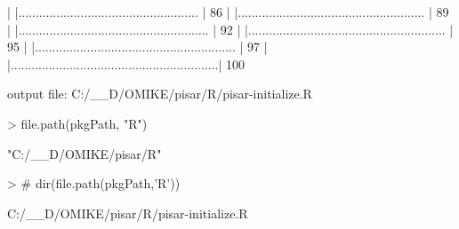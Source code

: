 \documentclass[a4paper,12pt]{article}\usepackage[]{graphicx}\usepackage[]{color}
\begin{document}
\begin{Schunk}
\begin{Soutput}
  |                                                                  
  |....................................................        |  86%
  |                                                                  
  |......................................................      |  89%
  |                                                                  
  |.......................................................     |  92%
  |                                                                  
  |.........................................................   |  95%
  |                                                                  
  |..........................................................  |  97%
  |                                                                  
  |............................................................| 100%
\end{Soutput}
\begin{Soutput}
output file: C:/__D/OMIKE/pisar/R/pisar-initialize.R
\end{Soutput}
\begin{Sinput}
> file.path(pkgPath, "R")
\end{Sinput}
\begin{Soutput}
[1] "C:/__D/OMIKE/pisar/R"
\end{Soutput}
\begin{Sinput}
> # dir(file.path(pkgPath,'R'))
\end{Sinput}
\end{Schunk}
 C:/__D/OMIKE/pisar/R/pisar-initialize.R

\clearpage
\end{document}
